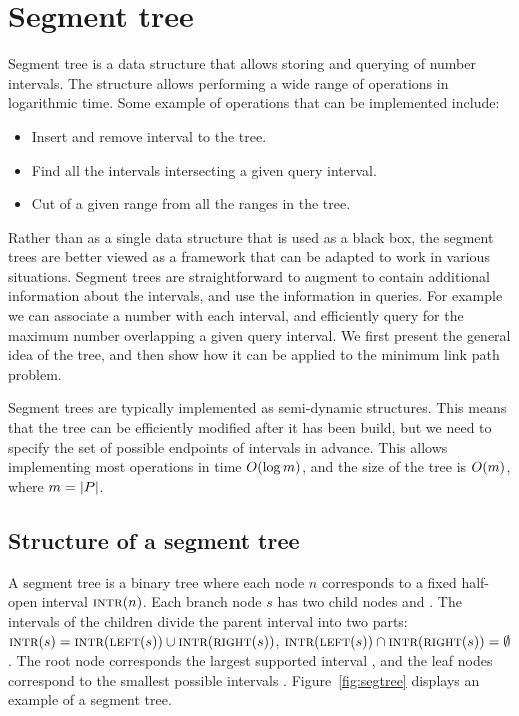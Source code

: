 \documentclass[english,gradu]{tktltiki2018}
\begin{document}
\section{Segment tree}\label{sec:segtree}

Segment tree is a data structure that allows storing and querying of number intervals.
The structure allows performing a wide range of operations in logarithmic time.
Some example of operations that can be implemented include:
\begin{itemize}
	\item Insert and remove interval to the tree.
	\item Find all the intervals intersecting a given query interval.
	\item Cut of a given range from all the ranges in the tree.
\end{itemize}

Rather than as a single data structure that is used as a black box, the segment trees are better viewed as a framework that can be adapted to work in various situations.
Segment trees are straightforward to augment to contain additional information about the intervals, and use the information in queries.
For example we can associate a number with each interval, and efficiently query for the maximum number overlapping a given query interval.
We first present the general idea of the tree, and then show how it can be applied to the minimum link path problem.

Segment trees are typically implemented as semi-dynamic structures.
This means that the tree can be efficiently modified after it has been build, but we need to specify the set of possible endpoints \epts of intervals in advance.
This allows implementing most operations in time $O(\log m)$, and the size of the tree is $O(m)$, where $m=\left |P\right |$.

\subsection{Structure of a segment tree}

A segment tree is a binary tree where each node $n$ corresponds to a fixed half-open interval $\textsc{intr}(n)$.
Each branch node $s$ has two child nodes  and .
The intervals of the children divide the parent interval into two parts:
$\textsc{intr}(s)=\textsc{intr}(\textsc{left}(s))\cup\textsc{intr}(\textsc{right}(s))$, $\textsc{intr}(\textsc{left}(s))\cap\textsc{intr}(\textsc{right}(s))=\emptyset$.
The root node corresponds the largest supported interval \range{\epts[1]}{\epts[\segsize]}, and the leaf nodes correspond to the smallest possible intervals \range{\epts[i]}{\epts[i+1]}.
Figure~\ref{fig:segtree} displays an example of a segment tree.
\end{document}
